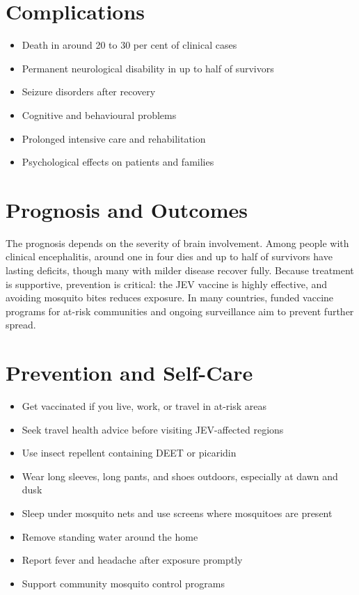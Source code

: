 \section*{Complications}
\begin{itemize}
    \item Death in around 20 to 30 per cent of clinical cases
    \item Permanent neurological disability in up to half of survivors
    \item Seizure disorders after recovery
    \item Cognitive and behavioural problems
    \item Prolonged intensive care and rehabilitation
    \item Psychological effects on patients and families
\end{itemize}

\section*{Prognosis and Outcomes}
The prognosis depends on the severity of brain involvement. Among people with clinical encephalitis, around one in four dies and up to half of survivors have lasting deficits, though many with milder disease recover fully. Because treatment is supportive, prevention is critical: the JEV vaccine is highly effective, and avoiding mosquito bites reduces exposure. In many countries, funded vaccine programs for at-risk communities and ongoing surveillance aim to prevent further spread.

\section*{Prevention and Self-Care}
\begin{itemize}
    \item Get vaccinated if you live, work, or travel in at-risk areas
    \item Seek travel health advice before visiting JEV-affected regions
    \item Use insect repellent containing DEET or picaridin
    \item Wear long sleeves, long pants, and shoes outdoors, especially at dawn and dusk
    \item Sleep under mosquito nets and use screens where mosquitoes are present
    \item Remove standing water around the home
    \item Report fever and headache after exposure promptly
    \item Support community mosquito control programs
\end{itemize}


